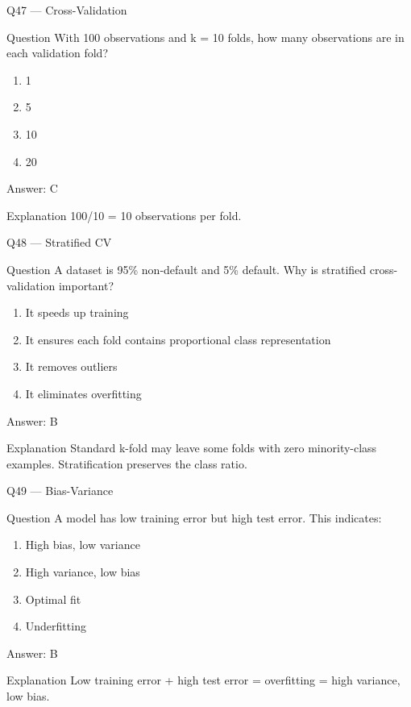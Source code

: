 \documentclass[aspectratio=169,8pt]{beamer}
\begin{document}
	\begin{frame}{Q47 --- Cross-Validation}
		\begin{block}{Question}
			With 100 observations and k = 10 folds, how many observations are in each validation fold?
		\end{block}
		\begin{enumerate}
			\item 1
			\item 5
			\item 10
			\item 20
		\end{enumerate}
		\begin{exampleblock}{Answer: C}\end{exampleblock}
		\begin{block}{Explanation}
			100/10 = 10 observations per fold.
		\end{block}
	\end{frame}
	
	\begin{frame}{Q48 --- Stratified CV}
		\begin{block}{Question}
			A dataset is 95\% non-default and 5\% default. Why is stratified cross-validation important?
		\end{block}
		\begin{enumerate}
			\item It speeds up training
			\item It ensures each fold contains proportional class representation
			\item It removes outliers
			\item It eliminates overfitting
		\end{enumerate}
		\begin{exampleblock}{Answer: B}\end{exampleblock}
		\begin{block}{Explanation}
			Standard k-fold may leave some folds with zero minority-class examples. Stratification preserves the class ratio.
		\end{block}
	\end{frame}
	
	\begin{frame}{Q49 --- Bias-Variance}
		\begin{block}{Question}
			A model has low training error but high test error. This indicates:
		\end{block}
		\begin{enumerate}
			\item High bias, low variance
			\item High variance, low bias
			\item Optimal fit
			\item Underfitting
		\end{enumerate}
		\begin{exampleblock}{Answer: B}\end{exampleblock}
		\begin{block}{Explanation}
			Low training error + high test error = overfitting = high variance, low bias.
		\end{block}
	\end{frame}
	
\end{document}
